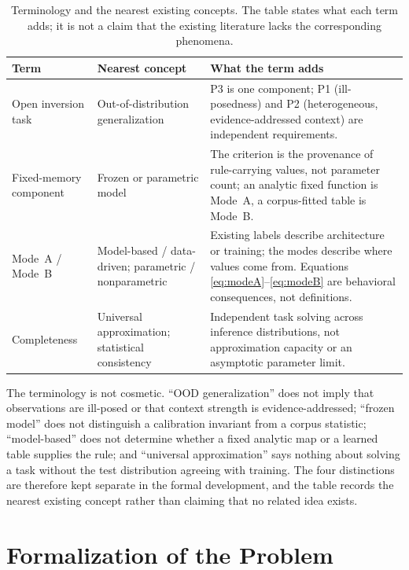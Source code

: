 \documentclass[twoside,11pt]{article}
\begin{document}
\begin{table}[t]
\caption{Terminology and the nearest existing concepts. The table states what each term adds; it is not a claim that the existing literature lacks the corresponding phenomena.}
\label{tab:terminology}
\centering
\small
\begin{tabular}{@{}>{\raggedright\arraybackslash}p{}>{\raggedright\arraybackslash}p{}>{\raggedright\arraybackslash}p{}@{}}
\hline
\textbf{Term} & \textbf{Nearest concept} & \textbf{What the term adds}\\
\hline
Open inversion task & Out-of-distribution generalization & P3 is one component; P1 (ill-posedness) and P2 (heterogeneous, evidence-addressed context) are independent requirements.\\
Fixed-memory component & Frozen or parametric model & The criterion is the provenance of rule-carrying values, not parameter count; an analytic fixed function is Mode~A, a corpus-fitted table is Mode~B.\\
Mode~A / Mode~B & Model-based / data-driven; parametric / nonparametric & Existing labels describe architecture or training; the modes describe where values come from. Equations \eqref{eq:modeA}--\eqref{eq:modeB} are behavioral consequences, not definitions.\\
Completeness & Universal approximation; statistical consistency & Independent task solving across inference distributions, not approximation capacity or an asymptotic parameter limit.\\
\hline
\end{tabular}
\end{table}

The terminology is not cosmetic. ``OOD generalization'' does not imply that observations are ill-posed or that context strength is evidence-addressed; ``frozen model'' does not distinguish a calibration invariant from a corpus statistic; ``model-based'' does not determine whether a fixed analytic map or a learned table supplies the rule; and ``universal approximation'' says nothing about solving a task without the test distribution agreeing with training. The four distinctions are therefore kept separate in the formal development, and the table records the nearest existing concept rather than claiming that no related idea exists.

\section{Formalization of the Problem}
\label{ch:formalize}%
\end{document}
